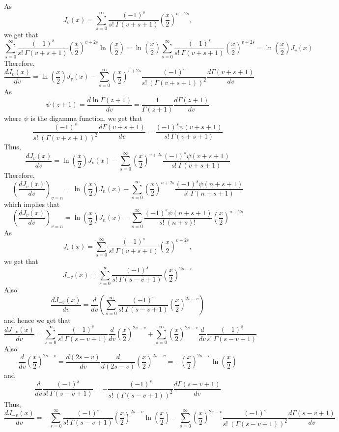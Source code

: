As 
$$J_{v}(x)=\sum_{s=0}^{\infty} \frac{(-1)^{s}}{s ! \  \Gamma(v+s+1)}\left(\frac{x}{2}\right)^{v+2 s},$$ 
we get that
$$\sum_{s=0}^{\infty} \frac{(-1)^{s}}{s ! \  \Gamma(v+s+1)}\left(\frac{x}{2}\right)^{v+2 s} \ln \left(\frac{x}{2}\right)=\ln \left(\frac{x}{2}\right) \sum_{s=0}^{\infty} \frac{(-1)^{s}}{s ! \  \Gamma(v+s+1)}\left(\frac{x}{2}\right)^{v+2 s}=\ln \left(\frac{x}{2}\right) J_{v}(x)$$
Therefore, 
$$\frac{d J_{v}(x)}{d v}=\ln \left(\frac{x}{2}\right) J_{v}(x)-\sum_{s=0}^{\infty}\left(\frac{x}{2}\right)^{v+2 s} \frac{(-1)^{s}}{s ! \ (\Gamma(v+s+1))^{2}} \frac{d \Gamma(v+s+1)}{d v}$$
As 
$$\psi(z+1)=\frac{d \ln \Gamma(z+1)}{d v}=\frac{1}{\Gamma(z+1)} \frac{d \Gamma(z+1)}{d v}$$ 
where $\psi$ is the digamma function, we get that 
$$\frac{(-1)^{s}}{s ! \ (\Gamma(v+s+1))^{2}} \frac{d \Gamma(v+s+1)}{d v}=\frac{(-1)^{s} \psi(v+s+1)}{s ! \  \Gamma(v+s+1)}$$
Thus, 
$$\frac{d J_{v}(x)}{d v}=\ln \left(\frac{x}{2}\right) J_{v}(x)-\sum_{s=0}^{\infty}\left(\frac{x}{2}\right)^{v+2 s} \frac{(-1)^{s} \psi(v+s+1)}{s ! \  \Gamma(v+s+1)}$$
Therefore, 
$$\left(\frac{d J_{v}(x)}{d v}\right)_{v=n}=\ln \left(\frac{x}{2}\right) J_{n}(x)-\sum_{s=0}^{\infty}\left(\frac{x}{2}\right)^{n+2 s} \frac{(-1)^{s} \psi(n+s+1)}{s ! \  \Gamma(n+s+1)}$$
which implies that
$$\left(\frac{d J_{v}(x)}{d v}\right)_{v=n}=\ln \left(\frac{x}{2}\right) J_{n}(x)-\sum_{s=0}^{\infty} \frac{(-1)^{s} \psi(n+s+1)}{s ! \ (n+s) ! \ }\left(\frac{x}{2}\right)^{n+2 s}$$
As 
$$J_{v}(x)=\sum_{s=0}^{\infty} \frac{(-1)^{s}}{s ! \  \Gamma(v+s+1)}\left(\frac{x}{2}\right)^{v+2 s},$$
we get that 
$$J_{-v}(x)=\sum_{s=0}^{\infty} \frac{(-1)^{s}}{s ! \  \Gamma(s-v+1)}\left(\frac{x}{2}\right)^{2 s-v}$$
Also 
$$\frac{d J_{-v}(x)}{d v}=\frac{d}{d v}\left(\sum_{s=0}^{\infty} \frac{(-1)^{s}}{s ! \  \Gamma(s-v+1)}\left(\frac{x}{2}\right)^{2 s-v}\right)$$ 
and hence we get that
$$\frac{d J_{-v}(x)}{d v}=\sum_{s=0}^{\infty} \frac{(-1)^{s}}{s ! \  \Gamma(s-v+1)} \frac{d}{d v}\left(\frac{x}{2}\right)^{2 s-v}+\sum_{s=0}^{\infty}\left(\frac{x}{2}\right)^{2 s-v} \frac{d}{d v} \frac{(-1)^{s}}{s ! \  \Gamma(s-v+1)}$$
Also 
$$\frac{d}{d v}\left(\frac{x}{2}\right)^{2 s-v}=\frac{d(2 s-v)}{d v} \frac{d}{d(2 s-v)}\left(\frac{x}{2}\right)^{2 s-v}=-\left(\frac{x}{2}\right)^{2 s-v} \ln \left(\frac{x}{2}\right)$$
and
$$\frac{d}{d v} \frac{(-1)^{s}}{s ! \  \Gamma(s-v+1)}=-\frac{(-1)^{s}}{s ! \ (\Gamma(s-v+1))^{2}} \frac{d \Gamma(s-v+1)}{d v}$$
Thus, 
$$\frac{d J_{-v}(x)}{d v}=-\sum_{s=0}^{\infty} \frac{(-1)^{s}}{s ! \  \Gamma(s-v+1)}\left(\frac{x}{2}\right)^{2 s-v} \ln \left(\frac{x}{2}\right)-\sum_{s=0}^{\infty}\left(\frac{x}{2}\right)^{2 s-v} \frac{(-1)^{s}}{s ! \ (\Gamma(s-v+1))^{2}} \frac{d \Gamma(s-v+1)}{d v}$$

